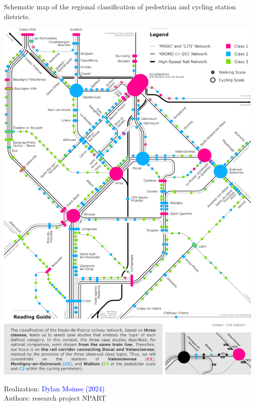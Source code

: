 \begin{refsegment}
    \begin{carte}[h!]\vspace*{4pt}
        \caption{Schematic map of the regional classification of pedestrian and cycling station districts.}
        \label{fig-chap6:schema-reseau-train-hdf-classes}
        \centerline{\includegraphics[width=1\columnwidth]{src/Figures/Chap-7/EN_Carte_Reseau_classification.pdf}}
        \vspace{5pt}
        \begin{flushright}\scriptsize{
        Realization: \textcolor{blue}{Dylan Moinse (2024)}
        \\
        Authors: research project \acrshort{NPART}
        }\end{flushright}
    \end{carte}


\end{refsegment}
